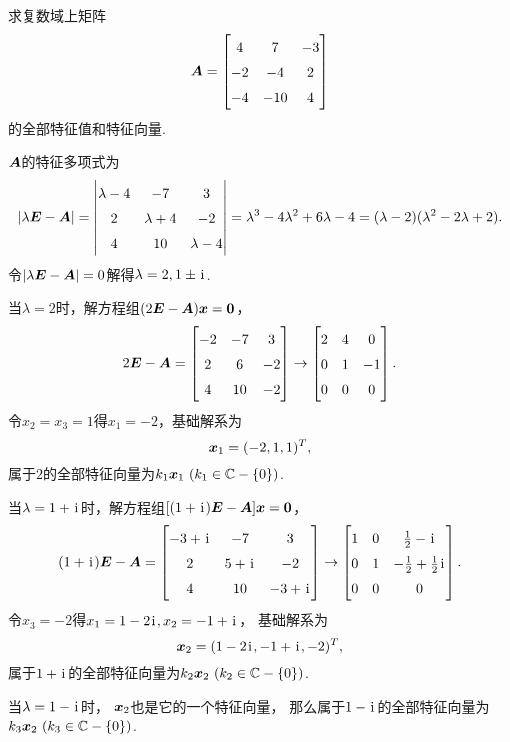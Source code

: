 \begin{example}
求复数域上矩阵\begin{equation*}
	\vb{A} = \begin{bmatrix}
		4 & 7 & -3 \\
		-2 & -4 & 2 \\
		-4 & -10 & 4
	\end{bmatrix}
\end{equation*}的全部特征值和特征向量.
\begin{solution}
\(\boldsymbol{A}\)的特征多项式为\begin{equation*}
	\abs{\lambda\vb{E}-\vb{A}}
	= \begin{vmatrix}
		\lambda-4 & -7 & 3 \\
		2 & \lambda+4 & -2 \\
		4 & 10 & \lambda-4
	\end{vmatrix}
	= \lambda^3 - 4\lambda^2 + 6\lambda - 4
	= (\lambda-2)(\lambda^2-2\lambda+2).
\end{equation*}
令\(\abs{\lambda\boldsymbol{E}-\boldsymbol{A}}=0\)解得\(\lambda=2,1\pm\kern1pt\mathrm{i}\kern1pt\).

当\(\lambda=2\)时，解方程组\((2\boldsymbol{E}-\boldsymbol{A})\boldsymbol{x}=\boldsymbol0\)，\begin{equation*}
	2\vb{E}-\vb{A} = \begin{bmatrix}
		-2 & -7 & 3 \\
		2 & 6 & -2 \\
		4 & 10 & -2
	\end{bmatrix} \to \begin{bmatrix}
		2 & 4 & 0 \\
		0 & 1 & -1 \\
		0 & 0 & 0
	\end{bmatrix}.
\end{equation*}
令\(x_2=x_3=1\)得\(x_1=-2\)，基础解系为\begin{equation*}
	\boldsymbol{x}_1 = (-2,1,1)^T,
\end{equation*}
属于\(2\)的全部特征向量为\(k_1\boldsymbol{x}_1\ (k_1\in\mathbb{C}-\{0\})\).

当\(\lambda=1+\kern1pt\mathrm{i}\kern1pt\)时，解方程组\([(1+\kern1pt\mathrm{i}\kern1pt)\boldsymbol{E}-\boldsymbol{A}]\boldsymbol{x}=\boldsymbol0\)，\begin{equation*}
	(1+\iu)\vb{E}-\vb{A} = \begin{bmatrix}
		-3+\iu & -7 & 3 \\
		2 & 5+\iu & -2 \\
		4 & 10 & -3+\iu
	\end{bmatrix}
	\to \def\arraystretch{1.5}\begin{bmatrix}
		1 & 0 & \frac{1}{2}-\iu \\
		0 & 1 & -\frac{1}{2}+\frac{1}{2}\iu \\
		0 & 0 & 0
	\end{bmatrix}.
\end{equation*}
令\(x_3=-2\)得\(x_1=1-2\kern1pt\mathrm{i}\kern1pt,x_2=-1+\kern1pt\mathrm{i}\kern1pt\)，
基础解系为\begin{equation*}
	\boldsymbol{x}_2 = (1-2\kern1pt\mathrm{i}\kern1pt,-1+\kern1pt\mathrm{i}\kern1pt,-2)^T,
\end{equation*}
属于\(1+\kern1pt\mathrm{i}\kern1pt\)的全部特征向量为\(k_2\boldsymbol{x}_2\ (k_2\in\mathbb{C}-\{0\})\).

当\(\lambda=1-\kern1pt\mathrm{i}\kern1pt\)时，
\(\boldsymbol{x}_2\)也是它的一个特征向量，
那么属于\(1-\kern1pt\mathrm{i}\kern1pt\)的全部特征向量为\(k_3\boldsymbol{x}_2\ (k_3\in\mathbb{C}-\{0\})\).
\end{solution}
\end{example}
